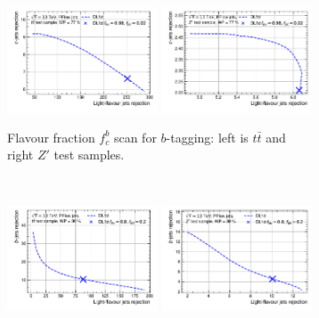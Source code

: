 \vspace{-1cm}
\begin{figure}[h!]
  \centering
  \begin{subfigure}[b]{\textwidth}
      \centering
      \includegraphics[width=0.49\textwidth]{Images/FTAG/DL1d/extra_plots/contour_fraction_ttbar_300.pdf}
      \includegraphics[width=0.49\textwidth]{Images/FTAG/DL1d/extra_plots/contour_fraction_zp_300.pdf}
      \caption{Flavour fraction $f_c^b$ scan for $b$-tagging: left is $t\bar{t}$ and right $Z'$ test samples.} 
      \label{fig:DL1dscanfb}
  \end{subfigure}\\
  \begin{subfigure}[b]{\textwidth}
    \centering %
    \includegraphics[width=0.49\textwidth]{Images/FTAG/DL1d/extra_plots/contour_fraction_c_ttbar_299.pdf}
    \includegraphics[width=0.49\textwidth]{Images/FTAG/DL1d/extra_plots/contour_fraction_c_zp_299.pdf}

\end{subfigure}
\end{figure}
